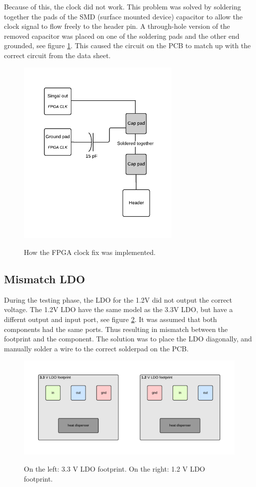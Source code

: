 \documentclass[../main/report.tex]{subfiles}
\begin{document}
Because of this, the clock did not work.
This problem was solved by soldering together the pads of the SMD (surface mounted device) capacitor to allow the clock signal to flow freely to the header pin.
A through-hole version of the removed capacitor was placed on one of the soldering pads and the other end grounded, see figure \ref{fig:pcb-clock-fix}.
This caused the circuit on the PCB to match up with the correct circuit from the data sheet.

\begin{figure}[H]
    \centering
    \includegraphics[width=0.7\textwidth]{../pcb/assets/pcb-clock-fix.pdf}
    \label{fig:pcb-clock-fix}
    \caption{How the FPGA clock fix was implemented.}
\end{figure}

\subsection{Mismatch LDO}
During the testing phase, the LDO for the 1.2V did not output the correct voltage. 
The 1.2V LDO have the same model as the 3.3V LDO, but have a differnt 
output and input port, see figure \ref{fig:ldo-footprints}.
It was assumed that both components had the same ports.
Thus resulting in mismatch between the footprint and the component.
The solution was to place the LDO diagonally,  and manually solder a wire to the correct solderpad on the PCB. 

\begin{figure}[H]
    \centering
    \includegraphics[width=\textwidth]{../pcb/assets/ldo-footprints.pdf}
    \label{fig:ldo-footprints}
    \caption{On the left: 3.3 V LDO footprint. On the right: 1.2 V LDO footprint.}
\end{figure}
\end{document}
